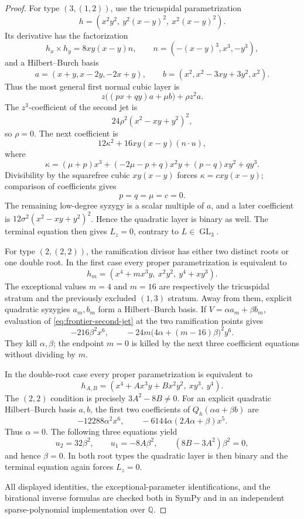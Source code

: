 \begin{proof}
For type \((3,(1,2))\), use the tricuspidal parametrization
\[
h=(x^2y^2,\ y^2(x-y)^2,\ x^2(x-y)^2).
\]
Its derivative has the factorization
\[
h_x\times h_y=8xy(x-y)n,\qquad
n=(-(x-y)^3,x^3,-y^3),
\]
and a Hilbert--Burch basis
\[
a=(x+y,x-2y,-2x+y),\qquad
b=(x^2,x^2-3xy+3y^2,x^2).
\]
Thus the most general first normal cubic layer is
\[
z\bigl((px+qy)a+\mu b\bigr)+\rho z^2a.
\]
The \(z^3\)-coefficient of the second jet is
\[
24\rho^2(x^2-xy+y^2)^2,
\]
so \(\rho=0\).  The next coefficient is
\[
12\kappa^2+16xy(x-y)(n\cdot u),
\]
where
\[
\kappa=(\mu+p)x^3+(-2\mu-p+q)x^2y+(p-q)xy^2+qy^3.
\]
Divisibility by the squarefree cubic \(xy(x-y)\) forces
\(\kappa=cxy(x-y)\); comparison of coefficients gives
\[
p=q=\mu=c=0.
\]
The remaining low-degree syzygy is a scalar multiple of \(a\), and a later
coefficient is \(12\sigma^2(x^2-xy+y^2)^2\).  Hence the quadratic layer is
binary as well.  The terminal equation then gives \(L_z=0\), contrary to
\(L\in\operatorname{GL}_3\).

For type \((2,(2,2))\), the ramification divisor has either two distinct
roots or one double root.  In the first case every proper parametrization
is equivalent to
\[
h_m=(x^4+mx^3y,\ x^2y^2,\ y^4+xy^3).
\]
The exceptional values \(m=4\) and \(m=16\) are respectively the
tricuspidal stratum and the previously excluded \((1,3)\) stratum.  Away
from them, explicit quadratic syzygies \(a_m,b_m\) form a Hilbert--Burch
basis.  If \(V=\alpha a_m+\beta b_m\), evaluation of
\eqref{eq:frontier-second-jet} at the two ramification points gives
\[
-216\beta^2x^6,\qquad
-24m\bigl(4\alpha+(m-16)\beta\bigr)^2y^6.
\]
They kill \(\alpha,\beta\); the endpoint \(m=0\) is killed by the next
three coefficient equations without dividing by \(m\).

In the double-root case every proper parametrization is equivalent to
\[
h_{A,B}=(x^4+Ax^3y+Bx^2y^2,\ xy^3,\ y^4).
\]
The \((2,2)\) condition is precisely \(3A^2-8B\ne0\).  For an explicit
quadratic Hilbert--Burch basis \(a,b\), the first two coefficients of
\(Q_h(\alpha a+\beta b)\) are
\[
-12288\alpha^2x^6,\qquad
-6144\alpha(2A\alpha+\beta)x^5.
\]
Thus \(\alpha=0\).  The following three equations yield
\[
u_2=32\beta^2,\qquad
u_1=-8A\beta^2,\qquad
(8B-3A^2)\beta^2=0,
\]
and hence \(\beta=0\).  In both root types the quadratic layer is then
binary and the terminal equation again forces \(L_z=0\).

All displayed identities, the exceptional-parameter identifications, and
the birational inverse formulas are checked both in SymPy and in an
independent sparse-polynomial implementation over \(\mathbb Q\).
\end{proof}

